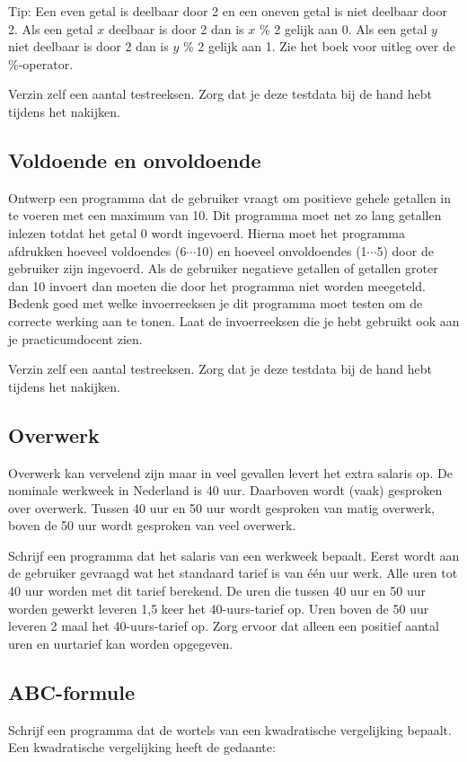 \documentclass[a4paper,10pt,fleqn,twoside]{article}
\begin{document}
Tip: Een even getal is deelbaar door 2 en een oneven getal is niet deelbaar door 2. Als een getal $x$ deelbaar is door 2 dan is $x$ \% 2 gelijk aan 0. Als een getal $y$ niet deelbaar is door 2 dan is $y$ \% 2 gelijk aan 1. Zie het boek voor uitleg over de \%-operator.

Verzin zelf een aantal testreeksen. Zorg dat je deze testdata bij de hand hebt tijdens het nakijken.

\subsection{Voldoende en onvoldoende}
Ontwerp een programma dat de gebruiker vraagt om positieve gehele getallen in te voeren met een maximum van 10. Dit programma moet net zo lang getallen inlezen totdat het getal 0 wordt ingevoerd. Hierna moet het programma afdrukken hoeveel voldoendes (6$\cdots$10) en hoeveel onvoldoendes (1$\cdots$5) door de gebruiker zijn ingevoerd. Als de gebruiker negatieve getallen of getallen groter dan 10 invoert dan moeten die door het programma niet worden meegeteld. Bedenk goed met welke invoerreeksen je dit programma moet testen om de correcte werking aan te tonen. Laat de invoerreeksen die je hebt gebruikt ook aan je practicumdocent zien.

Verzin zelf een aantal testreeksen. Zorg dat je deze testdata bij de hand hebt tijdens het nakijken.

\subsection{Overwerk}
Overwerk kan vervelend zijn maar in veel gevallen levert het extra salaris op. De nominale werkweek in Nederland is 40 uur. Daarboven wordt (vaak) gesproken over overwerk. Tussen 40 uur en 50 uur wordt gesproken van matig overwerk, boven de 50 uur wordt gesproken van veel overwerk.

Schrijf een programma dat het salaris van een werkweek bepaalt. Eerst wordt aan de gebruiker gevraagd wat het standaard tarief is van één uur werk. Alle uren tot 40 uur worden met dit tarief berekend. De uren die tussen 40 uur en 50 uur worden gewerkt leveren 1,5 keer het 40-uurs-tarief op. Uren boven de 50 uur leveren 2 maal het 40-uurs-tarief op. Zorg ervoor dat alleen een positief aantal uren en uurtarief kan worden opgegeven.

\subsection{ABC-formule}
Schrijf een programma dat de wortels van een kwadratische vergelijking bepaalt. Een kwadratische vergelijking heeft de gedaante:
\end{document}
